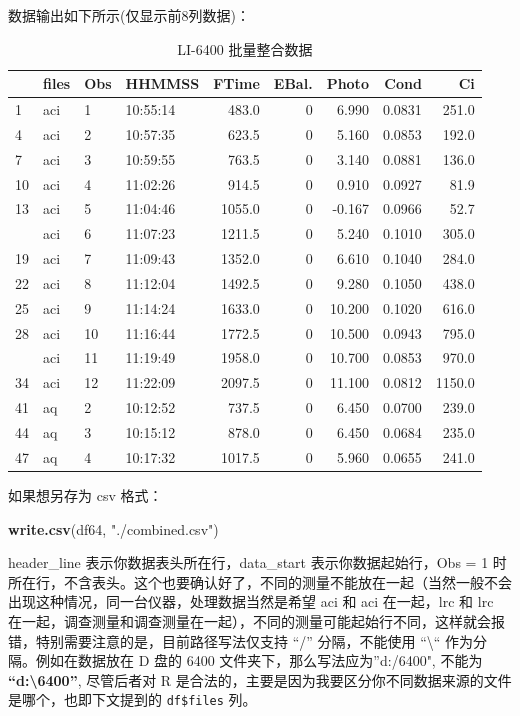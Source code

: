 \documentclass[
]{krantz}
\makeatletter
\newenvironment{Shaded}{\begin{snugshade}}{\end{snugshade}}
\newcommand{\KeywordTok}[1]{\textcolor[rgb]{0.13,0.29,0.53}{\textbf{#1}}}
\newcommand{\NormalTok}[1]{#1}
\newcommand{\StringTok}[1]{\textcolor[rgb]{0.31,0.60,0.02}{#1}}
\newenvironment{kframe}{%
\medskip{}
\setlength{\fboxsep}{.8em}
 \def\at@end@of@kframe{}%
 \ifinner\ifhmode%
  \def\at@end@of@kframe{\end{minipage}}%
  \begin{minipage}{\columnwidth}%
 \fi\fi%
 \def\FrameCommand##1{\hskip\@totalleftmargin \hskip-\fboxsep
 \colorbox{shadecolor}{##1}\hskip-\fboxsep
     \hskip-\linewidth \hskip-\@totalleftmargin \hskip\columnwidth}%
 \MakeFramed {\advance\hsize-\width
   \@totalleftmargin\z@ \linewidth\hsize
   \@setminipage}}%
 {\par\unskip\endMakeFramed%
 \at@end@of@kframe}
\renewenvironment{Shaded}{\begin{kframe}}{\end{kframe}}
\makeatother
\begin{document}
数据输出如下所示(仅显示前8列数据)：

\begin{table}

\caption{\label{tab:unnamed-chunk-5}LI-6400 批量整合数据}
\centering
\begin{tabular}[t]{llllrrrrr}
\toprule
  & files & Obs & HHMMSS & FTime & EBal. & Photo & Cond & Ci\\
\midrule
1 & aci & 1 & 10:55:14 & 483.0 & 0 & 6.990 & 0.0831 & 251.0\\
4 & aci & 2 & 10:57:35 & 623.5 & 0 & 5.160 & 0.0853 & 192.0\\
7 & aci & 3 & 10:59:55 & 763.5 & 0 & 3.140 & 0.0881 & 136.0\\
10 & aci & 4 & 11:02:26 & 914.5 & 0 & 0.910 & 0.0927 & 81.9\\
13 & aci & 5 & 11:04:46 & 1055.0 & 0 & -0.167 & 0.0966 & 52.7\\
\addlinespace
16 & aci & 6 & 11:07:23 & 1211.5 & 0 & 5.240 & 0.1010 & 305.0\\
19 & aci & 7 & 11:09:43 & 1352.0 & 0 & 6.610 & 0.1040 & 284.0\\
22 & aci & 8 & 11:12:04 & 1492.5 & 0 & 9.280 & 0.1050 & 438.0\\
25 & aci & 9 & 11:14:24 & 1633.0 & 0 & 10.200 & 0.1020 & 616.0\\
28 & aci & 10 & 11:16:44 & 1772.5 & 0 & 10.500 & 0.0943 & 795.0\\
\addlinespace
31 & aci & 11 & 11:19:49 & 1958.0 & 0 & 10.700 & 0.0853 & 970.0\\
34 & aci & 12 & 11:22:09 & 2097.5 & 0 & 11.100 & 0.0812 & 1150.0\\
41 & aq & 2 & 10:12:52 & 737.5 & 0 & 6.450 & 0.0700 & 239.0\\
44 & aq & 3 & 10:15:12 & 878.0 & 0 & 6.450 & 0.0684 & 235.0\\
47 & aq & 4 & 10:17:32 & 1017.5 & 0 & 5.960 & 0.0655 & 241.0\\
\bottomrule
\end{tabular}
\end{table}

如果想另存为 csv 格式：

\begin{Shaded}
\begin{Highlighting}[]
\KeywordTok{write.csv}\NormalTok{(df64, }\StringTok{"./combined.csv"}\NormalTok{)}
\end{Highlighting}
\end{Shaded}

header\_line 表示你数据表头所在行，data\_start 表示你数据起始行，Obs = 1 时所在行，不含表头。这个也要确认好了，不同的测量不能放在一起（当然一般不会出现这种情况，同一台仪器，处理数据当然是希望 aci 和 aci 在一起，lrc 和 lrc 在一起，调查测量和调查测量在一起），不同的测量可能起始行不同，这样就会报错，特别需要注意的是，目前路径写法仅支持 ``/'' 分隔，不能使用 ``\textbackslash{}`` 作为分隔。例如在数据放在 D 盘的 6400 文件夹下，那么写法应为''d:/6400", 不能为 \textbf{``d:\textbackslash{}6400''}, 尽管后者对 R 是合法的，主要是因为我要区分你不同数据来源的文件是哪个，也即下文提到的 \texttt{df\$files} 列。
\end{document}
